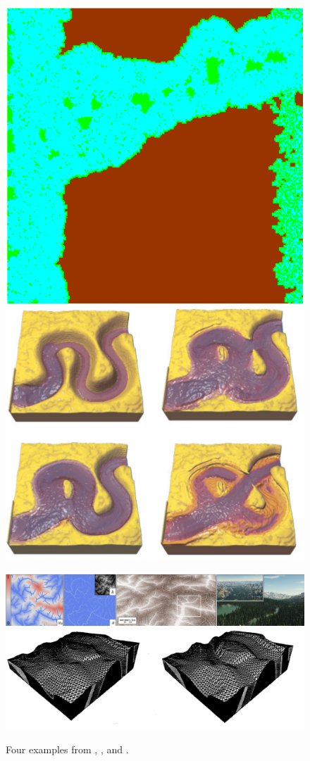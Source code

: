 \begin{figure}[H]
    \centering
    \begin{minipage}{0.45\linewidth}
        \includegraphics[width = 0.44 \linewidth]{erosionCellularHawick2014.png}
        \includegraphics[width = 0.44 \linewidth]{erosionHydraulicBenes2006.png}
    \end{minipage}
    \begin{minipage}{0.45\linewidth}
        \includegraphics[width = \linewidth]{erosionHydraulicSchott2023_2.png}
        \includegraphics[width = \linewidth]{erosionRoudier1993.png}
    \end{minipage}
    \caption{Four examples from \cite{Hawick2014}, \cite{Benes2006}, \cite{Schott2023} and \cite{Roudier1993}.}
    \label{fig:coral-island_erosion-example}
\end{figure}


